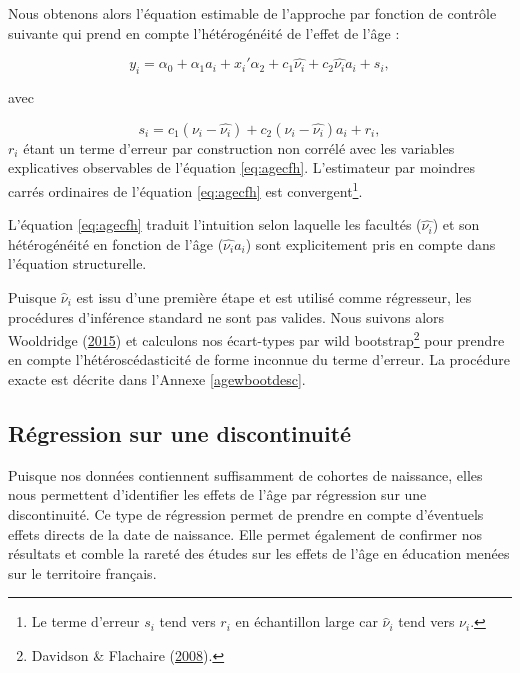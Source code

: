 \documentclass[
]{book}
\begin{document}
Nous obtenons alors l'équation estimable de l'approche par fonction de contrôle suivante qui prend en compte l'hétérogénéité de l'effet de l'âge :

\begin{equation}
\label{eq:agecfh}
y_i = \alpha_0 + \alpha_1 a_i + x_i' \alpha_2 + c_1 \hat{\nu_i} + c_2 \hat{\nu_i} a_i + s_i,
\end{equation}

avec

\[
s_i = c_1 (\nu_i - \hat{\nu_i}) + c_2 (\nu_i - \hat{\nu_i}) a_i + r_i,
\]
\(r_i\) étant un terme d'erreur par construction non corrélé avec les variables explicatives observables de l'équation \eqref{eq:agecfh}. L'estimateur par moindres carrés ordinaires de l'équation \eqref{eq:agecfh} est convergent\footnote{Le terme d'erreur \(s_i\) tend vers \(r_i\) en échantillon large car \(\hat{\nu}_i\) tend vers \(\nu_i\).}.

\quad L'équation \eqref{eq:agecfh} traduit l'intuition selon laquelle les facultés (\(\hat{\nu_i}\)) et son hétérogénéité en fonction de l'âge (\(\hat{\nu_i}a_i\)) sont explicitement pris en compte dans l'équation structurelle.

\quad Puisque \(\hat{\nu}_i\) est issu d'une première étape et est utilisé comme régresseur, les procédures d'inférence standard ne sont pas valides. Nous suivons alors Wooldridge (\protect\hyperlink{ref-WOO:15}{2015}) et calculons nos écart-types par wild bootstrap\footnote{Davidson \& Flachaire (\protect\hyperlink{ref-DAV:FLA:08}{2008}).} pour prendre en compte l'hétéroscédasticité de forme inconnue du terme d'erreur. La procédure exacte est décrite dans l'Annexe \ref{agewbootdesc}.

\hypertarget{agemethodsrd}{%
\subsection{Régression sur une discontinuité}\label{agemethodsrd}}

Puisque nos données contiennent suffisamment de cohortes de naissance, elles nous permettent d'identifier les effets de l'âge par régression sur une discontinuité. Ce type de régression permet de prendre en compte d'éventuels effets directs de la date de naissance. Elle permet également de confirmer nos résultats et comble la rareté des études sur les effets de l'âge en éducation menées sur le territoire français.
\end{document}
